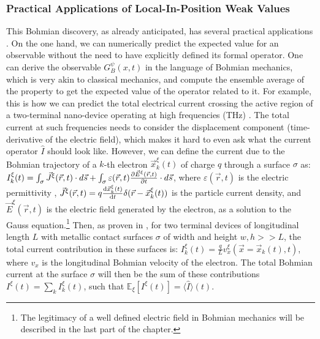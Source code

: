 \documentclass[11pt, a4paper]{article} %
\begin{document}
\subsubsection*{Practical Applications of Local-In-Position Weak Values}


This Bohmian discovery, as already anticipated, has several practical applications \cite{DevInPosition1, DevInPosition2}. On the one hand, we can numerically predict the expected value for an observable without the need to have explicitly defined its formal operator. One can derive the observable $G^\psi_B(x,t)$ in the language of Bohmian mechanics, which is very akin to classical mechanics, and compute the ensemble average of the property to get the expected value of the operator related to it. For example, this is how we can predict the total electrical current crossing the active region of a two-terminal nano-device operating at high frequencies (THz) \cite{equiv, Pel}. The total current at such frequencies needs to consider the displacement component (time-derivative of the electric field), which makes it hard to even ask what the current operator $\hat{I}$ should look like. However, we can define the current due to the Bohmian trajectory of a $k$-th electron $\vec{x}_k^\xi(t)$ of charge $q$ through a surface $\sigma$ as: $I_k^\xi(t)=\int_\sigma \vec{J}^\xi(\vec{r},t)\cdot d\vec{s}+\int_\sigma \varepsilon(\vec{r},t)\pdv{\vec{E}^\xi(\vec{r},t)}{t}\cdot d\vec{s}$, where $\varepsilon(\vec{r},t)$ is the electric permittivity , $\vec{J}^\xi(\vec{r},t)=q\dv{\vec{x}_k^\xi(t)}{t}\delta(\vec{r}-\vec{x}_k^\xi(t))$ is the particle current density, and $\vec{E}^\xi(\vec{r},t)$ is the electric field generated by the electron, as a solution to the Gauss equation.\footnote{The legitimacy of a well defined electric field in Bohmian mechanics will be described in the last part of the chapter.} Then, as proven in \cite{Pel}, for two terminal devices of longitudinal length $L$ with metallic contact surfaces $\sigma$ of width and height $w,h>>L$, the total current contribution in these surfaces is: $I^\xi_k(t)=\frac{q}{L}v_x^\xi(\vec{x}=\vec{x}_k(t), t) $, where $v_x$ is the longitudinal Bohmian velocity of the electron. The total Bohmian current at the surface $\sigma$ will then be the sum of these contributions $I^\xi(t)=\sum_k I^\xi_k(t)$, such that $\mathbb{E}_\xi [I^\xi(t)]=\langle \hat{I}\rangle(t)$. 
\end{document}
